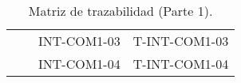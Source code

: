 \begin{table}[H]
\begin{tabular}{|l|l|ll|}
                                                       &                                                                                                                                                                                          & INT-COM1-03                                           & T-INT-COM1-03                                          \\
                                                       &                                                                                                                                                                                          & INT-COM1-04                                           & T-INT-COM1-04                                          \\ \hline
\end{tabular}
\caption{Matriz de trazabilidad (Parte 1).}
\end{table}

